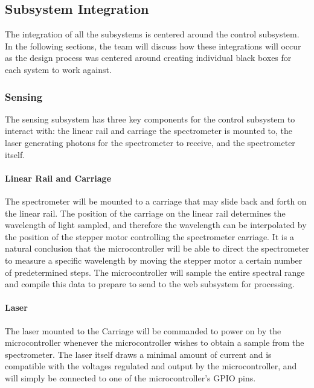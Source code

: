 \subsection{Subsystem Integration}
\label{sec:subsystem_integration}
The integration of all the subsystems is centered around the control subsystem. In the following sections, the team will discuss how these integrations will occur as the design process was centered around creating individual black boxes for each system to work against.

\subsubsection{Sensing}
The sensing subsystem has three key components for the control subsystem to interact with: the linear rail and carriage the spectrometer is mounted to, the laser generating photons for the spectrometer to receive, and the spectrometer itself.

\paragraph{Linear Rail and Carriage} The spectrometer will be mounted to a carriage that may slide back and forth on the linear rail. The position of the carriage on the linear rail determines the wavelength of light sampled, and therefore the wavelength can be interpolated by the position of the stepper motor controlling the spectrometer carriage. It is a natural conclusion that the microcontroller will be able to direct the spectrometer to measure a specific wavelength by moving the stepper motor a certain number of predetermined steps. The microcontroller will sample the entire spectral range and compile this data to prepare to send to the web subsystem for processing.
\begin{equation}
    \label{equation:wavelen-dist}
\end{equation}

\paragraph{Laser} The laser mounted to the Carriage will be commanded to power on by the microcontroller whenever the microcontroller wishes to obtain a sample from the spectrometer. The laser itself draws a minimal amount of current and is compatible with the voltages regulated and output by the microcontroller, and will simply be connected to one of the microcontroller's GPIO pins.

